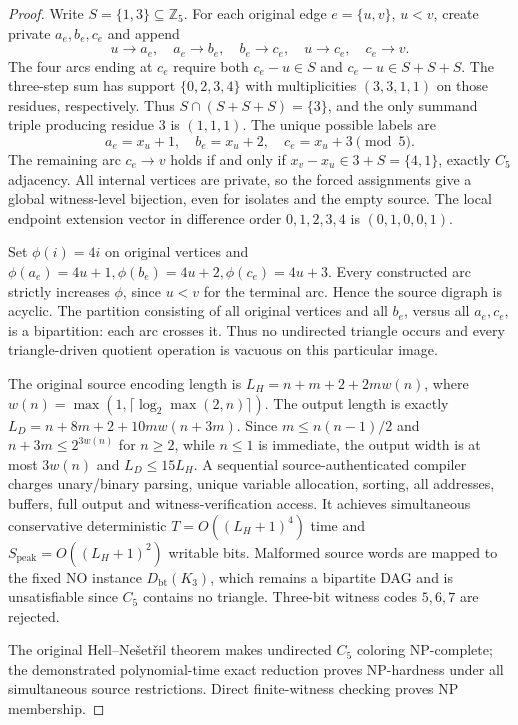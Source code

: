 \documentclass[11pt]{article}
\begin{document}
\begin{proof}
Write $S=\{1,3\}\subseteq\mathbb Z_5$.  For each original edge
$e=\{u,v\}$, $u<v$, create private $a_e,b_e,c_e$ and append
\[
 u\to a_e,\quad a_e\to b_e,\quad b_e\to c_e,\quad
 u\to c_e,\quad c_e\to v.
\]
The four arcs ending at $c_e$ require both
$c_e-u\in S$ and $c_e-u\in S+S+S$.  The three-step sum
has support $\{0,2,3,4\}$ with multiplicities $(3,3,1,1)$
on those residues, respectively.  Thus
$S\cap (S+S+S)=\{3\}$, and the only summand triple
producing residue $3$ is $(1,1,1)$.  The unique possible
labels are
\[
 a_e=x_u+1,\quad b_e=x_u+2,\quad c_e=x_u+3
 \pmod 5.
\]
The remaining arc $c_e\to v$ holds if and only if
$x_v-x_u\in3+S=\{4,1\}$, exactly $C_5$ adjacency.
All internal vertices are private, so the forced assignments
give a global witness-level bijection, even for isolates and
the empty source.  The local endpoint extension vector in
difference order $0,1,2,3,4$ is $(0,1,0,0,1)$.

Set $\phi(i)=4i$ on original vertices and
$\phi(a_e)=4u+1,\phi(b_e)=4u+2,\phi(c_e)=4u+3$.
Every constructed arc strictly increases $\phi$, since
$u<v$ for the terminal arc.  Hence the source digraph
is acyclic.  The partition consisting of all original vertices
and all $b_e$, versus all $a_e,c_e$, is a bipartition:
each arc crosses it.  Thus no undirected triangle occurs
and every triangle-driven quotient operation is vacuous
on this particular image.

The original source encoding length is
$L_H=n+m+2+2m w(n)$, where
$w(n)=\max(1,\lceil\log_2\max(2,n)\rceil)$.
The output length is exactly
$L_D=n+8m+2+10m w(n+3m)$.
Since $m\le n(n-1)/2$ and $n+3m\le2^{3w(n)}$ for
$n\ge2$, while $n\le1$ is immediate, the
output width is at most $3w(n)$ and
$L_D\le15L_H$.  A sequential source-authenticated
compiler charges unary/binary parsing, unique variable
allocation, sorting, all addresses, buffers, full output and
witness-verification access.  It achieves simultaneous
conservative deterministic
$T=O((L_H+1)^4)$ time and
$S_{\mathrm{peak}}=O((L_H+1)^2)$ writable bits.
Malformed source words are mapped to the fixed NO
instance $D_{\mathrm{bt}}(K_3)$, which remains a bipartite
DAG and is unsatisfiable since $C_5$ contains no
triangle.  Three-bit witness codes $5,6,7$ are rejected.

The original Hell--Ne\v{s}et\v{r}il theorem makes
undirected $C_5$ coloring NP-complete; the demonstrated
polynomial-time exact reduction proves NP-hardness under
all simultaneous source restrictions.  Direct finite-witness
checking proves NP membership.
\end{proof}
\end{document}
